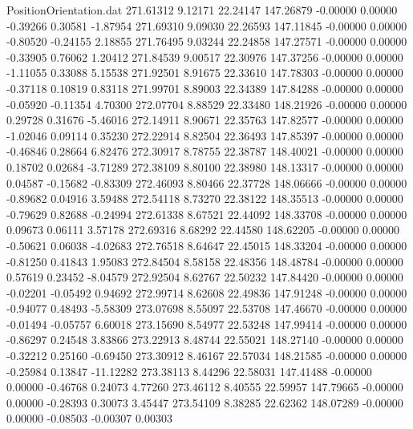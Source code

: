 \begin{filecontents}{PositionOrientation.dat}
 271.61312    9.12171   22.24147   147.26879   -0.00000    0.00000   -0.39266    0.30581   -1.87954
 271.69310    9.09030   22.26593   147.11845   -0.00000    0.00000   -0.80520   -0.24155    2.18855
 271.76495    9.03244   22.24858   147.27571   -0.00000    0.00000   -0.33905    0.76062    1.20412
 271.84539    9.00517   22.30976   147.37256   -0.00000    0.00000   -1.11055    0.33088    5.15538
 271.92501    8.91675   22.33610   147.78303   -0.00000    0.00000   -0.37118    0.10819    0.83118
 271.99701    8.89003   22.34389   147.84288   -0.00000    0.00000   -0.05920   -0.11354    4.70300
 272.07704    8.88529   22.33480   148.21926   -0.00000    0.00000    0.29728    0.31676   -5.46016
 272.14911    8.90671   22.35763   147.82577   -0.00000    0.00000   -1.02046    0.09114    0.35230
 272.22914    8.82504   22.36493   147.85397   -0.00000    0.00000   -0.46846    0.28664    6.82476
 272.30917    8.78755   22.38787   148.40021   -0.00000    0.00000    0.18702    0.02684   -3.71289
 272.38109    8.80100   22.38980   148.13317   -0.00000    0.00000    0.04587   -0.15682   -0.83309
 272.46093    8.80466   22.37728   148.06666   -0.00000    0.00000   -0.89682    0.04916    3.59488
 272.54118    8.73270   22.38122   148.35513   -0.00000    0.00000   -0.79629    0.82688   -0.24994
 272.61338    8.67521   22.44092   148.33708   -0.00000    0.00000    0.09673    0.06111    3.57178
 272.69316    8.68292   22.44580   148.62205   -0.00000    0.00000   -0.50621    0.06038   -4.02683
 272.76518    8.64647   22.45015   148.33204   -0.00000    0.00000   -0.81250    0.41843    1.95083
 272.84504    8.58158   22.48356   148.48784   -0.00000    0.00000    0.57619    0.23452   -8.04579
 272.92504    8.62767   22.50232   147.84420   -0.00000    0.00000   -0.02201   -0.05492    0.94692
 272.99714    8.62608   22.49836   147.91248   -0.00000    0.00000   -0.94077    0.48493   -5.58309
 273.07698    8.55097   22.53708   147.46670   -0.00000    0.00000   -0.01494   -0.05757    6.60018
 273.15690    8.54977   22.53248   147.99414   -0.00000    0.00000   -0.86297    0.24548    3.83866
 273.22913    8.48744   22.55021   148.27140   -0.00000    0.00000   -0.32212    0.25160   -0.69450
 273.30912    8.46167   22.57034   148.21585   -0.00000    0.00000   -0.25984    0.13847  -11.12282
 273.38113    8.44296   22.58031   147.41488   -0.00000    0.00000   -0.46768    0.24073    4.77260
 273.46112    8.40555   22.59957   147.79665   -0.00000    0.00000   -0.28393    0.30073    3.45447
 273.54109    8.38285   22.62362   148.07289   -0.00000    0.00000   -0.08503   -0.00307    0.00303

\end{filecontents}
